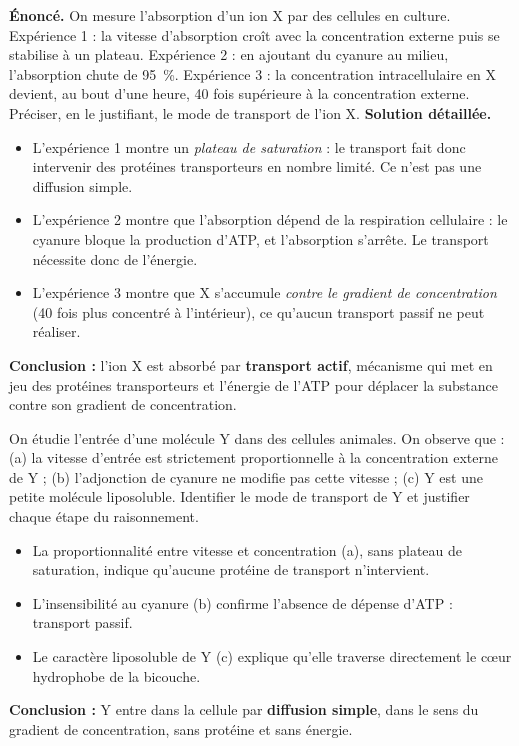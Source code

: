 \documentclass[11pt]{article}
\begin{document}
\begin{exoresolu}
\textbf{Énoncé.} On mesure l'absorption d'un ion X par des cellules en culture. Expérience 1 : la vitesse d'absorption croît avec la concentration externe puis se stabilise à un plateau. Expérience 2 : en ajoutant du cyanure au milieu, l'absorption chute de \SI{95}{\%}. Expérience 3 : la concentration intracellulaire en X devient, au bout d'une heure, 40 fois supérieure à la concentration externe. Préciser, en le justifiant, le mode de transport de l'ion X.
\tcblower
\textbf{Solution détaillée.}
\begin{itemize}
\item L'expérience 1 montre un \emph{plateau de saturation} : le transport fait donc intervenir des protéines transporteurs en nombre limité. Ce n'est pas une diffusion simple.
\item L'expérience 2 montre que l'absorption dépend de la respiration cellulaire : le cyanure bloque la production d'ATP, et l'absorption s'arrête. Le transport nécessite donc de l'énergie.
\item L'expérience 3 montre que X s'accumule \emph{contre le gradient de concentration} (40 fois plus concentré à l'intérieur), ce qu'aucun transport passif ne peut réaliser.
\end{itemize}
\textbf{Conclusion :} l'ion X est absorbé par \textbf{transport actif}, mécanisme qui met en jeu des protéines transporteurs et l'énergie de l'ATP pour déplacer la substance contre son gradient de concentration.
\end{exoresolu}

\begin{exercice}
On étudie l'entrée d'une molécule Y dans des cellules animales. On observe que : (a) la vitesse d'entrée est strictement proportionnelle à la concentration externe de Y ; (b) l'adjonction de cyanure ne modifie pas cette vitesse ; (c) Y est une petite molécule liposoluble. Identifier le mode de transport de Y et justifier chaque étape du raisonnement.
\end{exercice}

\begin{corrige}
\begin{itemize}
\item La proportionnalité entre vitesse et concentration (a), sans plateau de saturation, indique qu'aucune protéine de transport n'intervient.
\item L'insensibilité au cyanure (b) confirme l'absence de dépense d'ATP : transport passif.
\item Le caractère liposoluble de Y (c) explique qu'elle traverse directement le cœur hydrophobe de la bicouche.
\end{itemize}
\textbf{Conclusion :} Y entre dans la cellule par \textbf{diffusion simple}, dans le sens du gradient de concentration, sans protéine et sans énergie.
\end{corrige}
\end{document}
